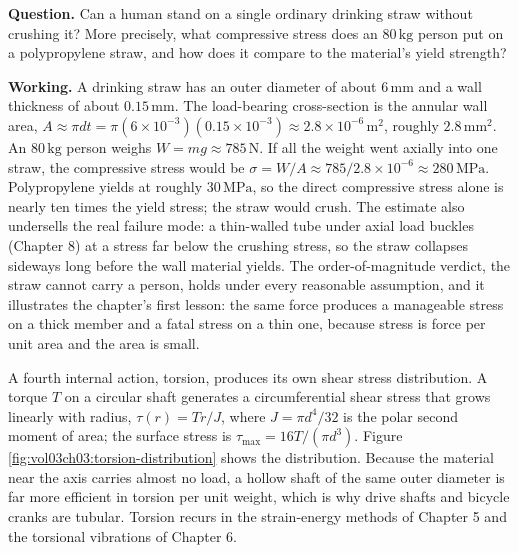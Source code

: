 

\begin{estimation}
\textbf{Question.} Can a human stand on a single ordinary drinking
straw without crushing it? More precisely, what compressive stress
does an $80\,\si{\kilogram}$ person put on a polypropylene straw, and
how does it compare to the material's yield strength?

\textbf{Working.} A drinking straw has an outer diameter of about
$6\,\si{\milli\meter}$ and a wall thickness of about $0.15\,\si{\milli
\meter}$. The load-bearing cross-section is the annular wall area,
$A \approx \pi d t = \pi (6\times 10^{-3})(0.15\times 10^{-3}) \approx
2.8\times 10^{-6}\,\si{\meter}^2$, roughly $2.8\,\si{\milli\meter}^2$.
An $80\,\si{\kilogram}$ person weighs $W = mg \approx 785\,\text{N}$. If
all the weight went axially into one straw, the compressive stress
would be $\sigma = W/A \approx 785/2.8\times 10^{-6} \approx 280\,
\text{MPa}$. Polypropylene yields at roughly $30\,\text{MPa}$, so the
direct compressive stress alone is nearly ten times the yield stress;
the straw would crush. The estimate also undersells the real failure
mode: a thin-walled tube under axial load buckles (Chapter 8) at a
stress far below the crushing stress, so the straw collapses sideways
long before the wall material yields. The order-of-magnitude verdict,
the straw cannot carry a person, holds under every reasonable
assumption, and it
illustrates the chapter's first lesson: the same force produces a
manageable stress on a thick member and a fatal stress on a thin one,
because stress is force per unit area and the area is small.
\end{estimation}

A fourth internal action, torsion, produces its own shear stress
distribution. A torque $T$ on a circular shaft generates a
circumferential shear stress that grows linearly with radius,
$\tau(r) = Tr/J$, where $J = \pi d^4/32$ is the polar second moment of
area; the surface stress is $\tau_{\max} = 16T/(\pi d^3)$. Figure
\ref{fig:vol03ch03:torsion-distribution} shows the distribution.
Because the material near the axis carries almost no load, a hollow
shaft of the same outer diameter is far more efficient in torsion per
unit weight, which is why drive shafts and bicycle cranks are tubular.
Torsion recurs in the strain-energy methods of Chapter 5 and the
torsional vibrations of Chapter 6.



